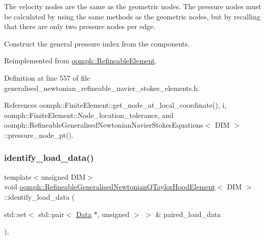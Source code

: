 The velocity nodes are the same as the geometric nodes. The pressure nodes must be calculated by using the same methods as the geometric nodes, but by recalling that there are only two pressure nodes per edge. 

Construct the general pressure index from the components. 

Reimplemented from \hyperlink{classoomph_1_1RefineableElement_ad920e66c00888c450f926f08c7793f78}{oomph\+::\+Refineable\+Element}.



Definition at line 557 of file generalised\+\_\+newtonian\+\_\+refineable\+\_\+navier\+\_\+stokes\+\_\+elements.\+h.



References oomph\+::\+Finite\+Element\+::get\+\_\+node\+\_\+at\+\_\+local\+\_\+coordinate(), i, oomph\+::\+Finite\+Element\+::\+Node\+\_\+location\+\_\+tolerance, and oomph\+::\+Refineable\+Generalised\+Newtonian\+Navier\+Stokes\+Equations$<$ D\+I\+M $>$\+::pressure\+\_\+node\+\_\+pt().

\mbox{\label{classoomph_1_1RefineableGeneralisedNewtonianQTaylorHoodElement_a1ac7edfbc1114f039d4ed73ad9234be3}} 
\subsubsection{\texorpdfstring{identify\+\_\+load\+\_\+data()}{identify\_load\_data()}}
{\footnotesize\ttfamily template$<$unsigned D\+IM$>$ \\
void \hyperlink{classoomph_1_1RefineableGeneralisedNewtonianQTaylorHoodElement}{oomph\+::\+Refineable\+Generalised\+Newtonian\+Q\+Taylor\+Hood\+Element}$<$ D\+IM $>$\+::identify\+\_\+load\+\_\+data (\begin{DoxyParamCaption}\item[{std\+::set$<$ std\+::pair$<$ \hyperlink{classoomph_1_1Data}{Data} $\ast$, unsigned $>$ $>$ \&}]{paired\+\_\+load\+\_\+data }\end{DoxyParamCaption})\hspace{0.3cm}{\ttfamily [inline]}, {\ttfamily [virtual]}}



